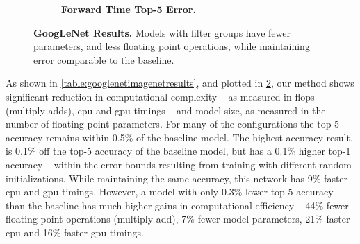 \documentclass[thesis]{subfiles}
\begin{document}
\begin{figure}[p]
\begin{subfigure}[b]{\textwidth}
			\centering
			\caption{\textbf{ Forward Time \vs Top-5 Error.}}
			\label{fig:googlenet50cpuforward}
		\end{subfigure}
		
		\caption[GoogLeNet  results]{\textbf{GoogLeNet  Results.} Models with filter groups have fewer parameters, and less floating point operations, while maintaining error comparable to the baseline.}
		\label{fig:googlenet50plots}
	\end{figure}
	
	As shown in \cref{table:googlenetimagenetresults}, and plotted in \cref{fig:googlenet50plots}, our method shows significant reduction in computational complexity -- as measured in \gls{flops} (multiply-adds), \gls{cpu} and \gls{gpu} timings -- and model size, as measured in the number of floating point parameters. For many of the configurations the top-5 accuracy remains within 0.5\% of the baseline model. 
	The highest accuracy result, is 0.1\% off the top-5 accuracy of the baseline model, but has a 0.1\% higher top-1 accuracy -- within the error bounds resulting from training with different random initializations. While maintaining the same accuracy, this network has 9\% faster \gls{cpu} and \gls{gpu} timings. However, a model with only 0.3\% lower top-5 accuracy than the baseline has much higher gains in computational efficiency -- 44\% fewer floating point operations (multiply-add), 7\% fewer model parameters, 21\% faster \gls{cpu} and 16\% faster \gls{gpu} timings.
	
\end{document}
